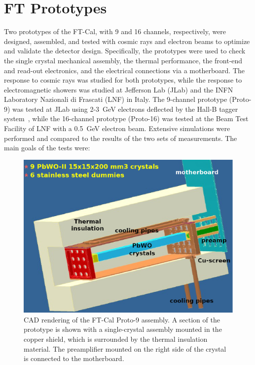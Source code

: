 \section{FT Prototypes}

Two prototypes of the FT-Cal, with 9 and 16 channels, respectively, were designed, assembled, and tested with
cosmic rays and electron beams to optimize and validate the detector design. Specifically, the prototypes were
used to check the single crystal mechanical assembly, the thermal performance, the front-end and read-out
electronics, and the electrical connections via a motherboard. The response to cosmic rays was studied for both
prototypes, while the response to electromagnetic showers was studied at Jefferson Lab (JLab) and the INFN
Laboratory Nazionali di Frascati (LNF) in Italy. The 9-channel prototype (Proto-9) was tested at JLab using 2-3~GeV
electrons deflected by the Hall-B tagger system~\cite{beamline},  while the 16-channel prototype (Proto-16) was
tested at the Beam Test Facility of LNF with a 0.5~GeV electron beam. Extensive simulations were performed
and compared to the results of the two sets of measurements. The main goals of the tests were:

\begin{figure}
\includegraphics[width=1.0\columnwidth]{./fig/p9-whole.eps}
\caption{CAD rendering of the FT-Cal Proto-9 assembly. A section of the prototype is shown with a single-crystal
  assembly mounted in the copper shield, which is surrounded by the thermal insulation material. The preamplifier
  mounted on the right side of the crystal is connected to the motherboard.}
\label{fig:p9-whole}
\end{figure}

